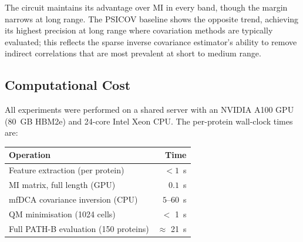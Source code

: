 The circuit maintains its advantage over MI in every band, though the margin
narrows at long range.  The PSICOV baseline shows the opposite trend,
achieving its highest precision at long range where covariation methods are
typically evaluated; this reflects the sparse inverse covariance estimator's
ability to remove indirect correlations that are most prevalent at short to
medium range.

\subsection{Computational Cost}
All experiments were performed on a shared server with an NVIDIA A100 GPU
(80~GB HBM2e) and 24-core Intel Xeon CPU.  The per-protein wall-clock times
are:

\begin{center}
	\begin{tabular}{lr}
		\toprule
		Operation                             & Time           \\
		\midrule
		Feature extraction (per protein)      & $< 1$~s        \\
		MI matrix, full length (GPU)          & $0.1$~s        \\
		mfDCA covariance inversion (CPU)      & $5$--$60$~s    \\
		QM minimisation (1024 cells)          & $<$ 1~s        \\
		Full PATH-B evaluation (150 proteins) & $\approx$ 21~s \\
		\bottomrule
	\end{tabular}
\end{center}
